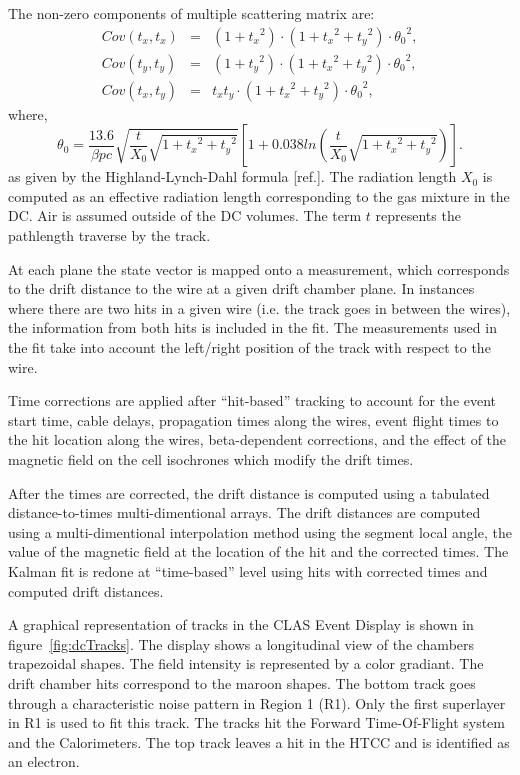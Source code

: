 \documentclass[3p,times,twocolumn]{elsarticle}
\begin{document}
The non-zero components of multiple scattering matrix are:
\begin{eqnarray*}
Cov (t_{x} , t_{x}) &=& (1+{t_x}^{2} )\cdot (1+{t_x}^{2} + {t_y}^2 )\cdot {\theta_{0}}^{2} , \\
Cov (t_{y} , t_{y}) &=& (1+{t_y}^{2} )\cdot (1+{t_x}^{2} + {t_y}^2 )\cdot {\theta_{0}}^{2} , \\
Cov (t_{x} , t_{y}) &=&  t_{x} t_{y}\cdot (1+{t_x}^{2} + {t_y}^2 )\cdot {\theta_{0}}^{2} ,
\end{eqnarray*}
where,
\begin{equation}
{\theta_{0}} = \frac{13.6}{\beta pc}\sqrt{\frac{t}{X_{0}}\sqrt{1+{t_x}^2+{t_y}^2}}\left[ {1+0.038 ln \left({\frac{t}{X_{0}}\sqrt{1+{t_x}^2+{t_y}^2}}\right) }\right].
\end{equation}
as given by the Highland-Lynch-Dahl formula [ref.].
The radiation length $X_0$ is computed as an effective radiation length corresponding to the gas mixture in the DC.
Air is assumed outside of the DC volumes. The term $t$ represents the pathlength traverse by the track.

At each plane the state vector is mapped onto a measurement, which corresponds to the drift distance to the
wire at a given drift chamber plane.  In instances where there are two hits in a given wire (i.e. the track
goes in between the wires), the information from both hits is included in the fit.
The measurements used in the fit
take into account the left/right position of the track with respect to the wire.

Time corrections are applied
after ``hit-based'' tracking to account for the event start time, cable delays, propagation times along the
wires, event flight times to the hit location along the wires, beta-dependent corrections, and the effect of
the magnetic field on the cell isochrones which modify the drift times.

After the times are corrected, the drift distance is computed using a tabulated distance-to-times
multi-dimentional arrays.  The drift distances are computed using a multi-dimentional interpolation method
using the segment local angle, the value of the magnetic field at the location of the hit and the corrected
times.  The Kalman fit is redone at ``time-based'' level using hits with corrected times and computed drift
distances.

A graphical representation of tracks in the CLAS Event Display is shown in figure~\ref{fig:dcTracks}.  The
display shows a longitudinal view of the chambers trapezoidal shapes. The field intensity is represented by a
color gradiant. The drift chamber hits correspond to the maroon shapes.  The bottom track goes through a
characteristic noise pattern in Region 1 (R1). Only the first superlayer in R1 is used to fit this track.  The
tracks hit the Forward Time-Of-Flight system and the Calorimeters.  The top track leaves a hit in the HTCC
and is identified as an electron.
\end{document}
